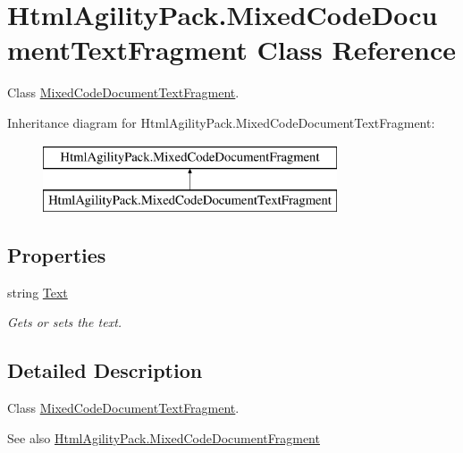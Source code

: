 \hypertarget{class_html_agility_pack_1_1_mixed_code_document_text_fragment}{}\section{Html\+Agility\+Pack.\+Mixed\+Code\+Document\+Text\+Fragment Class Reference}
\label{class_html_agility_pack_1_1_mixed_code_document_text_fragment}


Class \hyperlink{class_html_agility_pack_1_1_mixed_code_document_text_fragment}{Mixed\+Code\+Document\+Text\+Fragment}.  


Inheritance diagram for Html\+Agility\+Pack.\+Mixed\+Code\+Document\+Text\+Fragment\+:\begin{figure}[H]
\begin{center}
\leavevmode
\includegraphics[height=2.000000cm]{class_html_agility_pack_1_1_mixed_code_document_text_fragment}
\end{center}
\end{figure}
\subsection*{Properties}
\begin{DoxyCompactItemize}
\item 
string \hyperlink{class_html_agility_pack_1_1_mixed_code_document_text_fragment_a97688fad96ae0ed3c6510e76321532e3}{Text}
\begin{DoxyCompactList}\small\item\em Gets or sets the text. \end{DoxyCompactList}\end{DoxyCompactItemize}


\subsection{Detailed Description}
Class \hyperlink{class_html_agility_pack_1_1_mixed_code_document_text_fragment}{Mixed\+Code\+Document\+Text\+Fragment}. 

\begin{DoxySeeAlso}{See also}
\hyperlink{class_html_agility_pack_1_1_mixed_code_document_fragment}{Html\+Agility\+Pack.\+Mixed\+Code\+Document\+Fragment}


\end{DoxySeeAlso}



